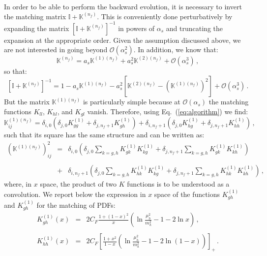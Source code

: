 \documentclass[10pt,a4paper]{article}
\begin{document}
In order to be able to perform the backward evolution, it is necessary
to invert the matching matrix $\mathbb{I}+\mathbb{K}^{(n_f)}$. This is
conveniently done perturbatively by expanding the matrix
$\left[\mathbb{I}+\mathbb{K}^{(n_f)}\right]^{-1}$ in powers of
$\alpha_s$ and truncating the expansion at the appropriate
order. Given the assumption discussed above, we are not interested in
going beyond $\mathcal{O}(\alpha_s^2)$. In addition, we know that:
\begin{equation}
\mathbb{K}^{(n_f)} = a_s \mathbb{K}^{(1)(n_f)}+a_s^2 \mathbb{K}^{(2)(n_f)}+\mathcal{O}(\alpha_s^3)\,,
\end{equation}
so that:
\begin{equation}\label{eq:inversion}
\left[\mathbb{I}+\mathbb{K}^{(n_f)}\right]^{-1} = 1 - a_s \mathbb{K}^{(1)(n_f)}-a_s^2\left[\mathbb{K}^{(2)(n_f)}-\left(\mathbb{K}^{(1)(n_f)}\right)^2\right]+\mathcal{O}(\alpha_s^3)\,.
\end{equation}
But the matrix $\mathbb{K}^{(1)(n_f)}$ is particularly simple because
at $\mathcal{O}(\alpha_s)$ the matching functions $K_{ll}$, $K_{hl}$,
and $K_{gl}$ vanish. Therefore, using Eq.~(\ref{eq:algorithm}) we
find:
\begin{equation}
\mathbb{K}_{ij}^{(1)(n_f)} =\delta_{i,0}\left(\delta_{j,0}K_{gg}^{(1)} +
\delta_{j,n_f+1}K_{gh}^{(1)}\right)+ \delta_{i,n_f+1}\left(\delta_{j,0}K_{hg}^{(1)}
+ \delta_{j,n_f+1}K_{hh}^{(1)}\right)\,,
\end{equation}
such that its square has the same structure and can be written as:
\begin{equation}\label{eq:squareK1}
\begin{array}{rcl}
\left(\mathbb{K}^{(1)(n_f)}\right) _{ij}^2 &=&\displaystyle \delta_{i,0}\left(\delta_{j,0}\sum_{k=g,h}K_{gk}^{(1)} K_{kg}^{(1)} +
\delta_{j,n_f+1}\sum_{k=g,h}K_{gk}^{(1)} K_{kh}^{(1)}\right)\\
\\
  &+&\displaystyle  \delta_{i,n_f+1}\left(\delta_{j,0}\sum_{k=g,h}K_{hk}^{(1)} K_{kg}^{(1)}
+ \delta_{j,n_f+1}\sum_{k=g,h}K_{hk}^{(1)} K_{kh}^{(1)}\right)\,,
\end{array}
\end{equation}
where, in $x$ space, the product of two $K$ functions is to be
understood as a convolution. We report below the expression in $x$
space of the functions $K_{gh}^{(1)}$ and $K_{gh}^{(1)}$ for the
matching of PDFs:
\begin{equation}
\begin{array}{rcl}
\displaystyle K_{gh}^{(1)}(x) &=&\displaystyle 
2C_F\frac{1+(1-x)^2}{x}\left(\ln\frac{\mu_h^2}{m_h^2}-1-2\ln x\right)\,,\\
\\
\displaystyle K_{hh}^{(1)}(x) &=&\displaystyle 
2C_F\left[\frac{1+x^2}{1-x}\left(\ln\frac{\mu_h^2}{m_h^2}-1-2\ln(1-x)\right)\right]_+\,.
\end{array}
\end{equation}
\end{document}
